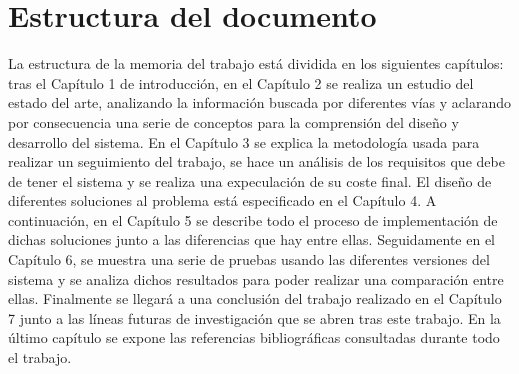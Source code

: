 \section{Estructura del documento}

La estructura de la memoria del trabajo está dividida en los siguientes capítulos: tras el Capítulo 1 de introducción, en el Capítulo 2 se realiza un estudio del estado del arte, analizando la información buscada por diferentes vías y aclarando por consecuencia una serie de conceptos para la comprensión del diseño y desarrollo del sistema.
En el Capítulo 3 se explica la metodología usada para realizar un seguimiento del trabajo, se hace un análisis de los requisitos que debe de tener el sistema y se realiza una expeculación de su coste final.
El diseño de diferentes soluciones al problema está especificado en el Capítulo 4. A continuación, en el Capítulo 5 se describe todo el proceso de implementación de dichas soluciones junto a las diferencias que hay entre ellas. 
Seguidamente en el Capítulo 6, se muestra una serie de pruebas usando las diferentes versiones del sistema y se analiza dichos resultados para poder realizar una comparación entre ellas. Finalmente se llegará a una conclusión del trabajo realizado en el Capítulo 7 junto a las líneas futuras de investigación que se abren tras este trabajo. En la último capítulo se expone las referencias bibliográficas consultadas durante todo el trabajo. 
